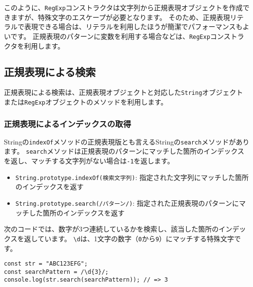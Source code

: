 このように、\texttt{RegExp}コンストラクタは文字列から正規表現オブジェクトを作成できますが、特殊文字のエスケープが必要となります。
そのため、正規表現リテラルで表現できる場合は、リテラルを利用したほうが簡潔でパフォーマンスもよいです。
正規表現のパターンに変数を利用する場合などは、\texttt{RegExp}コンストラクタを利用します。

\hypertarget{search-by-regexp}{%
\subsection{正規表現による検索}\label{search-by-regexp}}

正規表現による検索は、正規表現オブジェクトと対応した\texttt{String}オブジェクトまたは\texttt{RegExp}オブジェクトのメソッドを利用します。

\hypertarget{search-index-by-regexp}{%
\subsubsection{正規表現によるインデックスの取得}\label{search-index-by-regexp}}

Stringの\texttt{indexOf}メソッドの正規表現版とも言えるStringの\texttt{search}メソッドがあります。
\texttt{search}メソッドは正規表現のパターンにマッチした箇所のインデックスを返し、マッチする文字列がない場合は\texttt{-1}を返します。

\begin{itemize}
\item
  \texttt{String.prototype.indexOf(検索文字列)}:
  指定された文字列にマッチした箇所のインデックスを返す
\item
  \texttt{String.prototype.search(/パターン/)}:
  指定された正規表現のパターンにマッチした箇所のインデックスを返す
\end{itemize}

次のコードでは、数字が3つ連続しているかを検索し、該当した箇所のインデックスを返しています。
\texttt{\textbackslash d}は、1文字の数字（\texttt{0}から\texttt{9}）にマッチする特殊文字です。

\begin{lstlisting}
const str = "ABC123EFG";
const searchPattern = /\d{3}/;
console.log(str.search(searchPattern)); // => 3
\end{lstlisting}

